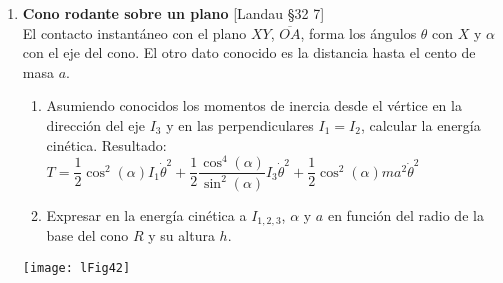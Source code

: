 \documentclass[11pt, spanish, a4paper, twoside]{article}
\begin{document}
\begin{enumerate}
	\item 
		\begin{minipage}[t][3.5cm]{0.53\textwidth}
			\textbf{Cono rodante sobre un plano} [Landau \S 32 7]\\
				 El contacto instantáneo con el plano \(X Y\), \(\overline{O A}\), forma los ángulos \(\theta\) con \(X\) y \(\alpha\) con el eje del cono.
				 El otro dato conocido es la distancia hasta el cento de masa \(a\).
				\begin{enumerate}
					\item Asumiendo conocidos los momentos de inercia desde el vértice en la dirección del eje \(I_3\) y en las perpendiculares \(I_1 = I_2\), calcular la energía cinética.
					Resultado:\\
					\(T = \dfrac{1}{2} \cos^2(\alpha) I_1 \dot{\theta}^{2} + \dfrac{1}{2} \dfrac{\cos^4(\alpha)}{\sin^2(\alpha)} I_3  \dot{\theta}^{2} + \dfrac{1}{2} \cos^2(\alpha) m a^{2} \dot{\theta}^{2} \)
					\item Expresar en la energía cinética a \(I_{1,2,3}\), \(\alpha\) y \(a\) en función del radio de la base del cono \(R\) y su altura \(h\).
				\end{enumerate}
		\end{minipage}
		\begin{minipage}[c][0cm][t]{0.4\textwidth}
			\texttt{[image: lFig42]}
		\end{minipage}

\end{enumerate}
\end{document}
